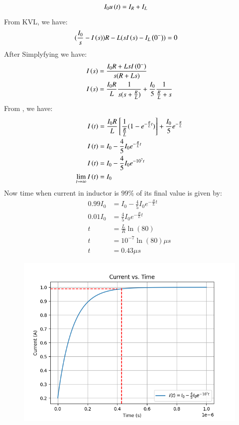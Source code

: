 \documentclass[journal,12pt,twocolumn]{IEEEtran}
\theoremstyle{remark}
\begin{document}
\begin{align}
    I_0u\left(t\right) &= I_R + I_L
\end{align}
From KVL, we have:
\begin{align}
    (\frac{I_0}{s} -I\left(s\right))R - L(sI\left(s\right) - I_L\left(0^-\right)) &=0
\end{align}
After Simplyfying we have:
\begin{align}
    I\left(s\right) &= \frac{ I_0R +LsI\left(0^-\right)}{s(R+Ls)}\\
    I\left(s\right) &= \frac{I_0R}{L}\frac{1}{s(s+\frac{R}{L})} + \frac{I_0}{5}\frac{1}{\frac{R}{L}+s}
\end{align}
From , we have:
\begin{align}
    I\left(t\right) & = \frac{I_0R}{L} {}\left[\frac{1}{\frac{R}{L}}(1-e^{-\frac{R}{L}t})\right] + \frac{I_0}{5}e^{-\frac{R}{L}}\\
    I\left(t\right) &= I_0 -\frac{4}{5}I_0e^{-\frac{R}{L}t}\\
    I\left(t\right) &= I_0 -\frac{4}{5}I_0e^{-10^{7}t}\\
    \lim_{t \to \infty} I\left(t\right) &= I_0
\end{align}
Now time when current in inductor is $99\%$ of its final value is given by:
\begin{align}
    0.99I_0 &= I_0 -\frac{4}{5}I_0e^{-\frac{R}{L}t}\\
    0.01I_0 &= \frac{4}{5}I_0e^{-\frac{R}{L}t}\\
    t &= \frac{L}{R}\ln(80)\\
    t &= 10^{-7}\ln(80) \mu s\\
    t &= 0.43 \mu s
\end{align}
\begin{figure}[ht!]
	\includegraphics[width=\columnwidth]{plots/Figure_1.png}
\end{figure}

  
\end{document}
